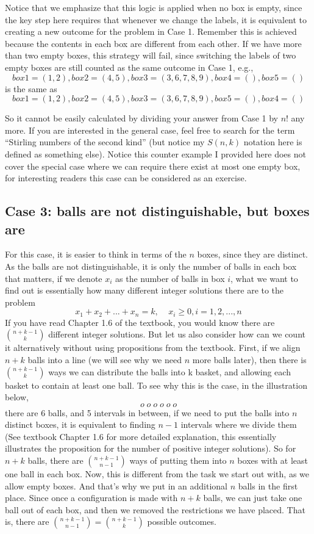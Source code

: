 \documentclass[12pt]{article}
\begin{document}
Notice that we emphasize that this logic is applied when no box is empty, since the key step here requires that whenever we change the labels, it is equivalent to creating a new outcome for the problem in Case 1. Remember this is achieved because the contents in each box are different from each other. If we have more than two empty boxes, this strategy will fail, since switching the labels of two empty boxes are still counted as the same outcome in Case 1, e.g., 
\[
	box 1 = (1, 2), box 2 = (4, 5), box 3 = (3, 6, 7, 8, 9), box 4 = (), box 5 = ()
\]
is the same as 
\[
	box 1 = (1, 2), box 2 = (4, 5), box 3 = (3, 6, 7, 8, 9), box 5 = (), box 4 = ()
\]

So it cannot be easily calculated by dividing your answer from Case 1 by $n!$ any more. If you are interested in the general case, feel free to search for the term ``Stirling numbers of the second kind'' (but notice my $S(n, k)$ notation here is defined as something else). Notice this counter example I provided here does not cover the special case where we can require there exist at most one empty box, for interesting readers this case can be considered as an exercise.

\subsection{Case 3: balls are not distinguishable, but boxes are}
For this case, it is easier to think in terms of the $n$ boxes, since they are distinct. As the balls are not distinguishable, it is only the number of balls in each box that matters, if we denote $x_i$ as the number of balls in box $i$, what we want to find out is essentially how many different integer solutions there are to the problem 
\[
	x_1 + x_2 + ... + x_n = k, \;\;\;\; x_i \geq 0, i = 1, 2, ..., n
\] 
If you have read Chapter 1.6 of the textbook, you would know there are ${n+k-1 \choose k}$ different integer solutions. But let us also consider how can we count it alternatively without using propositions from the textbook. First, if we align $n + k$ balls into a line (we will see why we need $n$ more balls later), then there is ${n+k-1 \choose k}$ ways we can distribute the balls into k basket, and allowing each basket to contain at least one ball. To see why this is the case, in the illustration below,
\[
	o \; o\;  o\;  o\;  o\;  o 
\] 
there are 6 balls, and 5 intervals in between, if we need to put the balls into $n$ distinct boxes, it is equivalent to finding $n-1$ intervals where we divide them (See textbook Chapter 1.6 for more detailed explanation, this essentially illustrates the proposition for the number of positive integer solutions). So for $n + k$ balls, there are ${n+k-1 \choose n-1}$ ways of putting them into $n$ boxes with at least one ball in each box. Now, this is different from the task we start out with, as we allow empty boxes. And that's why we put in an additional $n$ balls in the first place. Since once a configuration is made with $n + k$ balls, we can just take one ball out of each box, and then we removed the restrictions we have placed. That is, there are ${n+k-1 \choose n-1} = {n+k-1 \choose k}$ possible outcomes.
\end{document}
